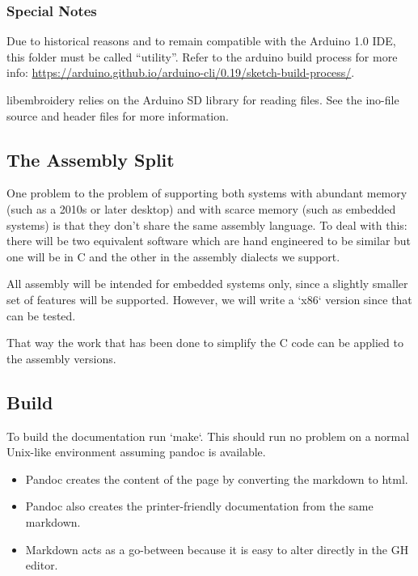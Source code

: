 \documentclass[a4paper, 11pt]{report}
\begin{document}
\subsubsection{Special Notes}

Due to historical reasons and to remain compatible with the Arduino 1.0
IDE, this folder must be called ``utility''. Refer to the arduino build
process for more info:
\url{https://arduino.github.io/arduino-cli/0.19/sketch-build-process/}.

libembroidery relies on the Arduino SD library for reading files. See
the ino-file source and header files for more information.

\subsection{The Assembly Split}

One problem to the problem of supporting both systems with abundant memory
(such as a 2010s or later desktop) and with scarce memory (such as embedded
systems) is that they don't share the same assembly language. To deal with
this: there will be two equivalent software which are hand engineered to be
similar but one will be in C and the other in the assembly dialects we support.

All assembly will be intended for embedded systems only, since a slightly
smaller set of features will be supported. However, we will write a
`x86` version since that can be tested.

That way the work that has been done to simplify the C code can be applied to
the assembly versions.

\subsection{Build}

To build the documentation run `make`. This should run no problem on a normal Unix-like environment
assuming pandoc is available.

\begin{itemize}
\item Pandoc creates the content of the page by converting the markdown to html.
\item Pandoc also creates the printer-friendly documentation from the same markdown.
\item Markdown acts as a go-between because it is easy to alter directly in the GH editor.
\end{itemize}
\end{document}
